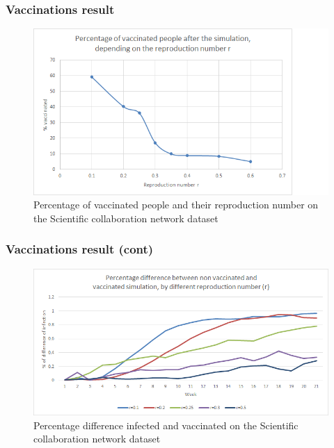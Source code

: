 \documentclass{beamer}
\begin{document}
\begin{frame}
\frametitle{Vaccinations result}
\begin{figure}[H]\label{fig:perc_vac}
\centering	
\includegraphics[scale=0.6]{img/vaccScientfic.png}
\caption{Percentage of vaccinated people and their reproduction number on the Scientific collaboration network dataset}
\end{figure} 

\end{frame}


\begin{frame}
\frametitle{Vaccinations result (cont)}
\begin{figure}[H]\label{fig:perc_diff}
\raggedright
\includegraphics[scale=0.55]{img/Scientific_diff_perc.png}
\caption{Percentage difference infected and vaccinated on the Scientific collaboration network dataset}
\end{figure} 

\end{frame}
\end{document}
